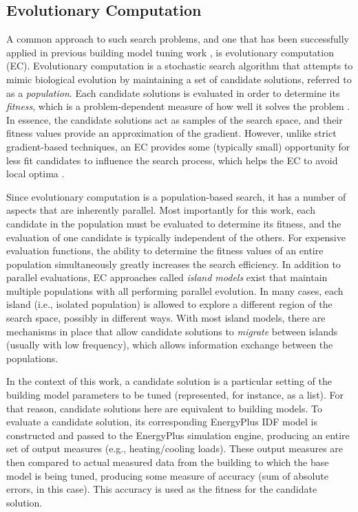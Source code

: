 \documentclass[preprint, review, 12pt]{elsarticle}
\begin{document}
\subsection{Evolutionary Computation}
A common approach to such search problems, and one that has been successfully applied in previous building model tuning work \cite{cit:garrett2013}, is evolutionary computation (EC). Evolutionary computation \cite{cit:dejong1993,cit:spears1993,cit:fogel1994,cit:fogel2000} is a stochastic search algorithm that attempts to mimic biological evolution by maintaining a set of candidate solutions, referred to as a \emph{population}. Each candidate solutions is evaluated in order to determine its \emph{fitness}, which is a problem-dependent measure of how well it solves the problem \cite{cit:dejong2006}. In essence, the candidate solutions act as samples of the search space, and their fitness values provide an approximation of the gradient. However, unlike strict gradient-based techniques, an EC provides some (typically small) opportunity for less fit candidates to influence the search process, which helps the EC to avoid local optima \cite{cit:michalewicz2004}. 

Since evolutionary computation is a population-based search, it has a number of aspects that are inherently parallel. Most importantly for this work, each candidate in the population must be evaluated to determine its fitness, and the evaluation of one candidate is typically independent of the others. For expensive evaluation functions, the ability to determine the fitness values of an entire population simultaneously greatly increases the search efficiency. In addition to parallel evaluations, EC approaches called \emph{island models} \cite{cit:eiben2007} exist that maintain multiple populations with all performing parallel evolution. In many cases, each island (i.e., isolated population) is allowed to explore a different region of the search space, possibly in different ways. With most island models, there are mechanisms in place that allow candidate solutions to \emph{migrate} between islands (usually with low frequency), which allows information exchange between the populations.

In the context of this work, a candidate solution is a particular setting of the building model parameters to be tuned (represented, for instance, as a list). For that reason, candidate solutions here are equivalent to building models. To evaluate a candidate solution, its corresponding EnergyPlus IDF model is constructed and passed to the EnergyPlus simulation engine, producing an entire set of output measures (e.g., heating/cooling loads). These output measures are then compared to actual measured data from the building to which the base model is being tuned, producing some measure of accuracy (sum of absolute errors, in this case). This accuracy is used as the fitness for the candidate solution.
\end{document}
